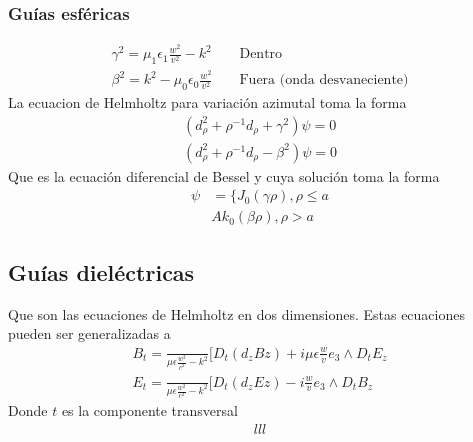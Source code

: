 \subsubsection{Guías esféricas}
\begin{subequations}
	\begin{align}
	\gamma^2 =  \mu_{1} \epsilon_{1} \frac{w^2}{v^2} - k^2   && \text{  Dentro}\\
	\beta^2 = k^2 - \mu_{0} \epsilon_{0} \frac{w^2}{v^2}   && \text{ Fuera (onda desvaneciente)}
		\end{align}
	\end{subequations}
La ecuacion de Helmholtz para variación azimutal toma la forma
\begin{subequations}
	\begin{align}
		(d_{\rho}^2+\rho^{-1} d_{\rho}+\gamma^2) \psi = 0\\
			(d_{\rho}^2+\rho^{-1} d_{\rho}-\beta^2) \psi = 0
	\end{align}
\end{subequations}
Que es la ecuación diferencial de Bessel y cuya solución toma la forma
\begin{equation} \label{Soluciones metalico bessel}
\begin{split}
	\psi  & = \bigg \{ J_{0} (\gamma \rho), \rho \leq a\\
          &   A k_{0} (\beta \rho), \rho > a
\end{split}
\end{equation}
\subsection{Guías dieléctricas}
Que son las ecuaciones de Helmholtz en dos dimensiones. Estas ecuaciones pueden ser generalizadas a
\begin{subequations}
	\begin{align}
	B_{t}=\frac{}{\mu \epsilon\frac{w^2}{c^2}-k^2}[D_{t} (d_{z} B{z})+i\mu\epsilon\frac{w}{v}e_{3}\wedge D_{t}E_{z} \\
	E_{t}=\frac{}{\mu \epsilon\frac{w^2}{c^2}-k^2}[D_{t} (d_{z} E{z})-i\frac{w}{v}e_{3}\wedge D_{t}B_{z} 
	\end{align}
	\end{subequations}
Donde $t$ es la componente transversal
\begin{subequations}
	\begin{align}
	lll
	\end{align}
\end{subequations}